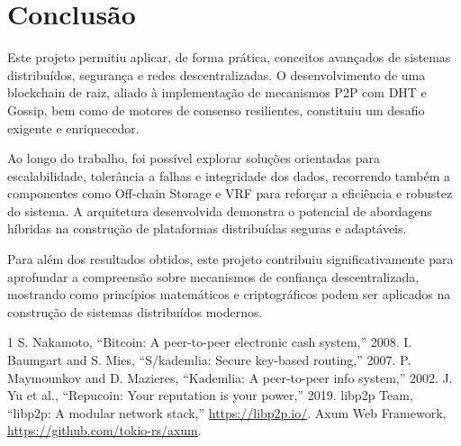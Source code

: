 \documentclass[11pt]{article}
\begin{document}
\section{Conclusão}

Este projeto permitiu aplicar, de forma prática, conceitos avançados de sistemas distribuídos, segurança e redes descentralizadas. O desenvolvimento de uma blockchain de raiz, aliado à implementação de mecanismos P2P com DHT e Gossip, bem como de motores de consenso resilientes, constituiu um desafio exigente e enriquecedor.

Ao longo do trabalho, foi possível explorar soluções orientadas para escalabilidade, tolerância a falhas e integridade dos dados, recorrendo também a componentes como Off-chain Storage e VRF para reforçar a eficiência e robustez do sistema. A arquitetura desenvolvida demonstra o potencial de abordagens híbridas na construção de plataformas distribuídas seguras e adaptáveis.

Para além dos resultados obtidos, este projeto contribuiu significativamente para aprofundar a compreensão sobre mecanismos de confiança descentralizada, mostrando como princípios matemáticos e criptográficos podem ser aplicados na construção de sistemas distribuídos modernos.

\newpage
\begin{thebibliography}{1}
 S. Nakamoto, ``Bitcoin: A peer-to-peer electronic cash system,'' 2008.
 I. Baumgart and S. Mies, ``S/kademlia: Secure key-based routing,'' 2007.
 P. Maymounkov and D. Mazieres, ``Kademlia: A peer-to-peer info system,'' 2002.
 J. Yu et al., ``Repucoin: Your reputation is your power,'' 2019.
 libp2p Team, ``libp2p: A modular network stack,'' \url{https://libp2p.io/}.
 Axum Web Framework, \url{https://github.com/tokio-rs/axum}.
\end{thebibliography}
\end{document}
